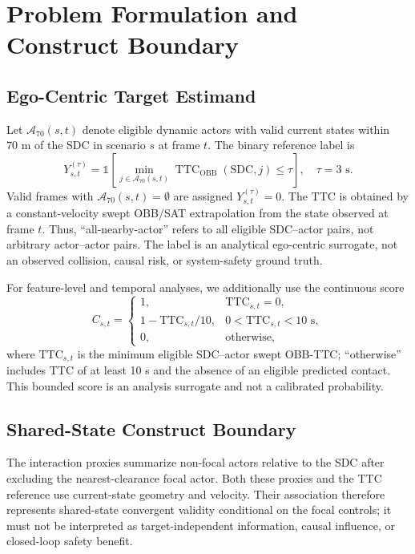 \section{Problem Formulation and Construct Boundary}
\label{sec:construct}

\subsection{Ego-Centric Target Estimand}
Let $\mathcal{A}_{70}(s,t)$ denote eligible dynamic actors with valid current states within $70\text{ m}$ of the SDC in scenario $s$ at frame $t$. The binary reference label is
\begin{equation}
Y_{s,t}^{(\tau)} = \mathbb{1}\!\left[\min_{j \in \mathcal{A}_{70}(s,t)} \operatorname{TTC}_{\mathrm{OBB}}(\mathrm{SDC}, j) \le \tau\right], \quad \tau = 3\text{ s}.
\end{equation}
Valid frames with $\mathcal{A}_{70}(s,t) = \emptyset$ are assigned $Y_{s,t}^{(\tau)} = 0$. The TTC is obtained by a constant-velocity swept OBB/SAT extrapolation from the state observed at frame $t$. Thus, ``all-nearby-actor'' refers to all eligible SDC--actor pairs, not arbitrary actor--actor pairs. The label is an analytical ego-centric surrogate, not an observed collision, causal risk, or system-safety ground truth.

For feature-level and temporal analyses, we additionally use the continuous score
\begin{equation}
C_{s,t} = \begin{cases}
1, & \mathrm{TTC}_{s,t} = 0,\\
1 - \mathrm{TTC}_{s,t}/10, & 0 < \mathrm{TTC}_{s,t} < 10\text{ s},\\
0, & \text{otherwise},
\end{cases}
\end{equation}
where $\mathrm{TTC}_{s,t}$ is the minimum eligible SDC--actor swept OBB-TTC; ``otherwise'' includes TTC of at least 10 s and the absence of an eligible predicted contact. This bounded score is an analysis surrogate and not a calibrated probability.

\subsection{Shared-State Construct Boundary}
The interaction proxies summarize non-focal actors relative to the SDC after excluding the nearest-clearance focal actor. Both these proxies and the TTC reference use current-state geometry and velocity. Their association therefore represents shared-state convergent validity conditional on the focal controls; it must not be interpreted as target-independent information, causal influence, or closed-loop safety benefit.

